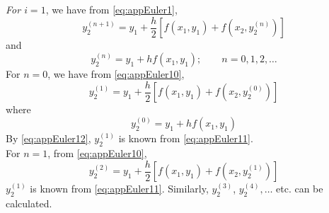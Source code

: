 \documentclass[../main-sheet.tex]{subfiles}
\begin{document}
\emph{For \(i=1\)}, we have from \eqref{eq:appEuler1},
\begin{equation}
    y_2^{(n+1)}=y_1+\frac{h}{2}\left[ f(x_1,y_1)+f(x_{2},y_{2}^{(n)}) \right]
    \label{eq:appEuler9}
\end{equation}
and 
\begin{equation}
    y_{2}^{(n)}=y_1+hf(x_1,y_1);\qquad n=0,1,2,\dots \label{eq:appEuler10}
\end{equation}
For \(n=0\), we have from \eqref{eq:appEuler10},
\begin{equation}
    y_2^{(1)}=y_1+\frac{h}{2}\left[ f(x_1,y_1)+f(x_{2},y_{2}^{(0)}) \right]
    \label{eq:appEuler11}
\end{equation}
where 
\begin{equation}
    y_{2}^{(0)}=y_1+hf(x_1,y_1) \label{eq:appEuler12}
\end{equation}
By \eqref{eq:appEuler12}, \(y_2^{(1)}\) is known from \eqref{eq:appEuler11}.\\
For \(n=1\), from \eqref{eq:appEuler10},
\begin{equation}
    y_2^{(2)}=y_1+\frac{h}{2}\left[ f(x_1,y_1)+f(x_{2},y_{2}^{(1)}) \right]
    \label{eq:appEuler13}
\end{equation}
\(y_2^{(1)}\) is known from \eqref{eq:appEuler11}.
Similarly, \(y_2^{(3)}\), \(y_2^{(4)}, \dots\) etc. can be calculated.
\end{document}
